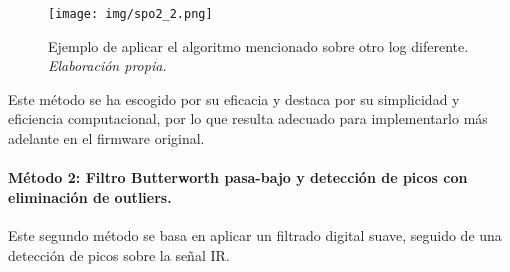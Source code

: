 \begin{figure}[H]
    \centering
    \texttt{[image: img/spo2\_2.png]}
    \caption{Ejemplo de aplicar el algoritmo mencionado sobre otro log diferente. \textit{Elaboración propia.}}
    \label{fig:spo2_2}
\end{figure}

Este método se ha escogido por su eficacia y destaca por su simplicidad y eficiencia computacional, por lo que resulta adecuado para implementarlo más adelante en el firmware original.


\paragraph{Método 2: Filtro Butterworth pasa-bajo y detección de picos con eliminación de outliers.}

Este segundo método se basa en aplicar un filtrado digital suave, seguido de una detección de picos sobre la señal IR.

